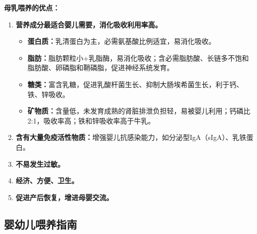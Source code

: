 \begin{keybox}
\textbf{母乳喂养的优点：}
\begin{enumerate}[leftmargin=*]
    \item \textbf{营养成分最适合婴儿需要，消化吸收利用率高。}
    \begin{itemize}[leftmargin=*]
        \item \textbf{蛋白质：}乳清蛋白为主，必需氨基酸比例适宜，易消化吸收。
        \item \textbf{脂肪：}脂肪颗粒小+乳脂酶，易消化吸收；含必需脂肪酸、长链多不饱和脂肪酸、卵磷脂和鞘磷脂，促进神经系统发育。
        \item \textbf{糖类：}富含乳糖，促进乳酸杆菌生长、抑制大肠埃希菌生长，利于钙、铁、锌吸收。
        \item \textbf{矿物质：}含量低，未发育成熟的肾脏排泄负担轻，易被婴儿利用；钙磷比2:1，吸收率高；铁和锌吸收率高于牛乳。
    \end{itemize}

    \item \textbf{含有大量免疫活性物质：}增强婴儿抗感染能力，如分泌型IgA（sIgA）、乳铁蛋白。

    \item \textbf{不易发生过敏。}

    \item \textbf{经济、方便、卫生。}

    \item \textbf{促进产后恢复，增进母婴交流。}
\end{enumerate}
\end{keybox}

\subsection{婴幼儿喂养指南}

